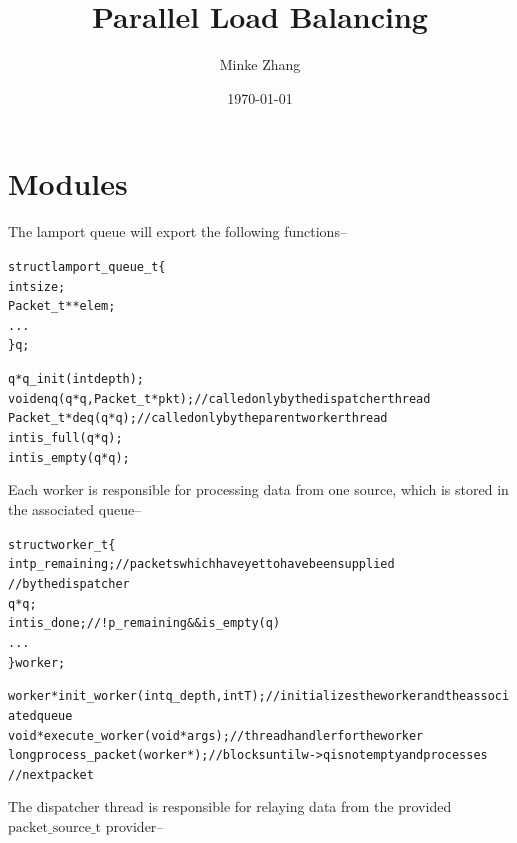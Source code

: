 \documentclass{article}
\newcommand{\tb}[1]{\textbf{#1}}
\newcommand{\cpart}[1]{\newblock{\LARGE {\\\\#1}}}
\newcommand{\code}[1]{\texttt{$\text{#1}$}}
\begin{document}

\title{\tb{Parallel Load Balancing}}
\author{Minke Zhang\hspace*{-\tabcolsep}}
\date{\today}

\begingroup
\let\center\flushright
\let\endcenter\endflushright
\maketitle
\endgroup

\section{Modules}

\cpart{Lamport Queue}

The lamport queue will export the following functions--

\begin{alltt}
struct lamport_queue_t \{
  int size;
  Packet_t **elem;
  ...
\} q;

q *q_init(int depth);
void enq(q *q, Packet_t *pkt);          // called only by the dispatcher thread
Packet_t *deq(q *q);                    // called only by the parent worker thread
int is_full(q *q);
int is_empty(q *q);

\end{alltt}

\cpart{Workers}

Each worker is responsible for processing data from one source, which is stored in the associated queue--
\begin{alltt}
struct worker_t \{
  int p_remaining;                        // packets which have yet to have been supplied
                                          //   by the dispatcher
  q *q;
  int is_done;                            // !p_remaining && is_empty(q)
  ...
\} worker;

worker *init_worker(int q_depth, int T);  // initializes the worker and the associated queue
void *execute_worker(void *args);         // thread handler for the worker
long process_packet(worker *);            // blocks until w->q is not empty and processes
                                          //   next packet

\end{alltt}

\cpart{Dispatcher}

The dispatcher thread is responsible for relaying data from the provided \code{packet\_source\_t} provider--
\end{document}
